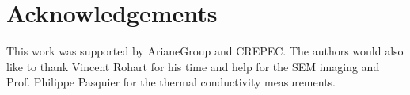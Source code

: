 \section{Acknowledgements}

This work was supported by ArianeGroup and CREPEC. 
The authors would also like to thank Vincent Rohart for his time and help for the SEM imaging and Prof. Philippe Pasquier for the thermal conductivity measurements. 

\FloatBarrier